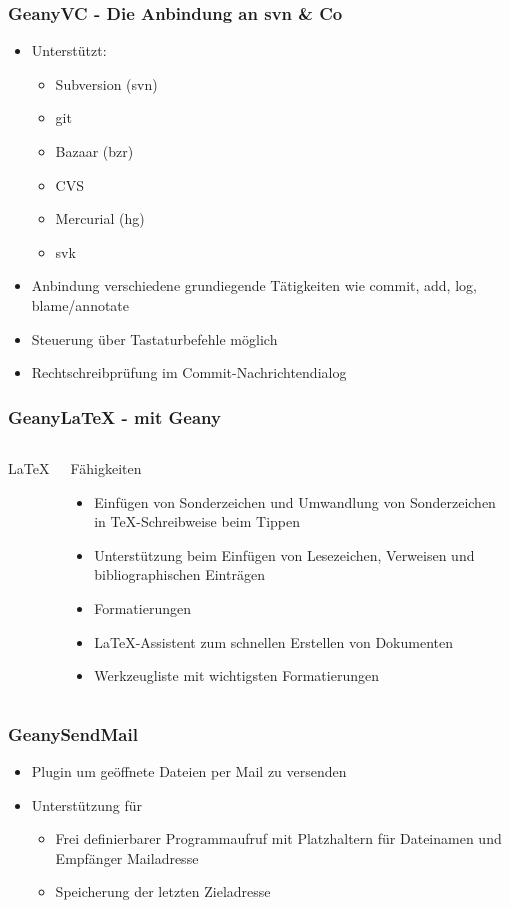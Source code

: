 \begin{frame}
  \frametitle{GeanyVC - Die Anbindung an svn \& Co}
  \begin{block}{}
    \begin{itemize}
    \item Unterstützt:
      \begin{itemize}
      \item Subversion (svn)
      \item git
      \item Bazaar (bzr)
      \item CVS
      \item Mercurial (hg)
      \item svk
      \end{itemize}
    \item Anbindung verschiedene grundiegende Tätigkeiten wie commit,
      add, log, blame/annotate
    \item Steuerung über Tastaturbefehle möglich
    \item Rechtschreibprüfung im Commit-Nachrichtendialog
    \end{itemize}
  \end{block}
\end{frame}

\begin{frame}
  \frametitle{GeanyLaTeX - \LaTeXe mit Geany}
  \begin{columns}[c]
    \column[c]{2cm} \huge \LaTeX \column{8cm}
    \begin{block}{Fähigkeiten}
      \begin{itemize}
      \item Einfügen von Sonderzeichen und Umwandlung von
        Sonderzeichen in \TeX-Schreibweise beim Tippen
      \item Unterstützung beim Einfügen von Lesezeichen, Verweisen und
        bibliographischen Einträgen
      \item Formatierungen
      \item \LaTeX-Assistent zum schnellen Erstellen von Dokumenten
      \item Werkzeugliste mit wichtigsten Formatierungen
      \end{itemize}
    \end{block}
  \end{columns}
\end{frame}

\begin{frame}
  \frametitle{GeanySendMail}
  \begin{itemize}
  \item Plugin um geöffnete Dateien per Mail zu versenden
  \item Unterstützung für
    \begin{itemize}
    \item Frei definierbarer Programmaufruf mit Platzhaltern für
      Dateinamen und Empfänger Mailadresse
    \item Speicherung der letzten Zieladresse
    \end{itemize}
  \end{itemize}
\end{frame}

